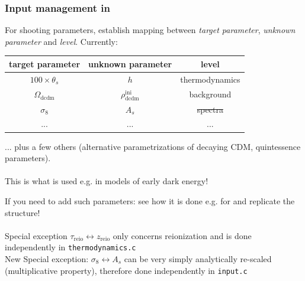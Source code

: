 \begin{frame}[fragile]
	\frametitle{Input management in {\Red \CLASS{}}}
	
	For {\Red shooting} parameters, establish mapping between {\it target parameter}, {\it unknown parameter} and {\it level}. Currently:
	\begin{center}
		\begin{tabular}{|c|c|c|}
			\hline
			target parameter & unknown parameter & level\\
			\hline
			$100 \times \theta_s$ & $h$ & thermodynamics \\
			$\Omega_\mathrm{dcdm}$ & $\rho^\mathrm{ini}_\mathrm{dcdm}$ & background \\ \sout{$\sigma_8$} & \sout{$A_s$} & \sout{spectra} \\
			... & ... & ...\\
			\hline
		\end{tabular}
	\end{center}
	... plus a few others (alternative parametrizations of decaying CDM, quintessence parameters).\\
	\mbox{}\\
	This is what is used e.g. in models of early dark energy!\\
	
	\vspace{1cm}
	
	If you need to add such parameters: see how it is done e.g. for  and replicate the structure!\\
	\mbox{}\\
	{\color{purple}Special exception} $\tau_\mathrm{reio} \leftrightarrow z_\mathrm{reio}$ only concerns reionization and is done independently in \texttt{thermodynamics.c}
	\mbox{}\\
	{\Red New Special exception:} $\sigma_8 \leftrightarrow A_s$ can be very simply analytically re-scaled (multiplicative property), therefore done independently in \texttt{input.c}
\end{frame}




